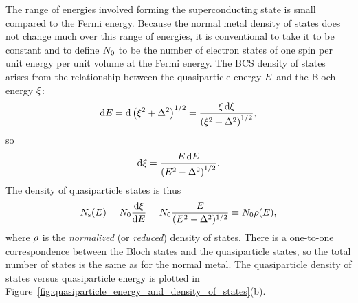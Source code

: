 The range of energies involved forming the superconducting state is small compared to the Fermi energy.
Because the normal metal density of states does not change much over this range of energies, it is conventional to take it to be constant and to define $N_0$ to be the number of electron states of one spin per unit energy per unit volume at the Fermi energy.
The BCS density of states arises from the relationship between the quasiparticle energy $E$ and the Bloch energy $\xi$:
\begin{equation}
\dd{E}
  =
  \dd{\left( \xi^2 + \Delta^2 \right)^{1/2}}
  =
  \frac{\xi \dd{\xi}}{\left( \xi^2 + \Delta^2 \right)^{1/2}},
\end{equation}
so
\begin{equation}
\dd{\xi}
  =
  \frac{E \dd{E}}{\left(E^2 - \Delta^2 \right)^{1/2}}.
\end{equation}
The density of quasiparticle states is thus
\begin{equation}
N_\mathrm{s}(E)
  =
  N_0 \dv{\xi}{E}
  =
  N_0 \frac{E}{(E^2 - \Delta^2)^{1/2}}
  \equiv
  N_0 \rho(E),
\label{eqn:supssdos}
\end{equation}
where $\rho$ is the \textit{normalized} (or \textit{reduced}) density of states.
There is a one-to-one correspondence between the Bloch states and the quasiparticle states, so the total number of states is the same as for the normal metal.
The quasiparticle density of states versus quasiparticle energy is plotted in Figure~\ref{fig:quasiparticle_energy_and_density_of_states}(b).

